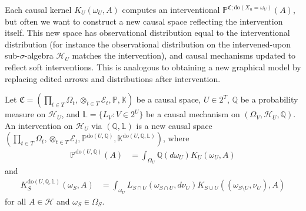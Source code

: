 \documentclass[../main.tex]{subfiles}
\begin{document}
    Each causal kernel ${K_U(\omega_U, A)}$ computes an interventional ${\mathbb{P}^{\mathfrak{C};\text{do}(X_u = \omega_U)}(A)}$, but often we want to construct a new causal space reflecting the intervention itself. This new space has observational distribution equal to the interventional distribution (for instance the observational distribution on the intervened-upon sub-$\sigma$-algebra $\mathcal{H}_U$ matches the intervention), and causal mechanisms updated to reflect soft interventions. This is analogous to obtaining a new graphical model by replacing edited arrows and distributions after intervention.

    \begin{defn}
        \label{defn:Interventions}
            Let ${\mathfrak{C} = (\prod_{t\in T}\Omega_t, \otimes_{t\in T}\mathcal{E}_t, \mathbb{P}, \mathbb{K})}$ be a causal space, ${U\in 2^T}$, ${\mathbb{Q}}$ be a probability measure on ${\mathcal{H}_U}$, and ${\mathbb{L}=\{L_V : V\in 2^U\}}$ be a causal mechanism on ${(\Omega_V,\mathcal{H}_U, \mathbb{Q})}$. An intervention on ${\mathcal{H}_U}$ via ${(\mathbb{Q}, \mathbb{L})}$ is a new causal space \\${(\prod_{t\in T}\Omega_t, \otimes_{t\in T}\mathcal{E}_t, \mathbb{P}^{\text{do}(U, \mathbb{Q})}, \mathbb{K}^{\text{do}(U, \mathbb{Q}, \mathbb{L})})}$, where 
            \begin{align*}
                \mathbb{P}^{\text{do}(U, \mathbb{Q})}(A) &= \int_{\Omega_U} \mathbb{Q}(d\omega_U)K_U(\omega_U,A)
            \end{align*}
            and
            \begin{align*}
                K_S^{\text{do}(U, \mathbb{Q}, \mathbb{L})}(\omega_S, A) &= \int_{\omega_U} L_{S\cap U}(\omega_{S\cap U},d\nu_U)K_{S\cup U}((\omega_{S\setminus U}, \nu_U), A)
            \end{align*}
            for all ${A\in \mathcal{H}}$ and ${\omega_S\in \Omega_S}$.
    \end{defn}
\end{document}
